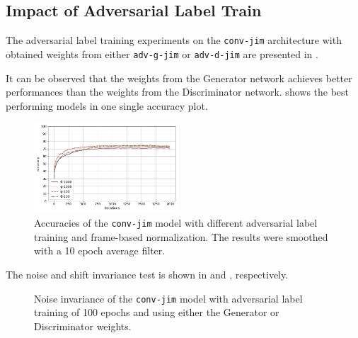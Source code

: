 \subsection{Impact of Adversarial Label Train}\label{sec:exp_adv_label}
The adversarial label training experiments on the \texttt{conv-jim} architecture with obtained weights from either \texttt{adv-g-jim} or \texttt{adv-d-jim} are presented in .

It can be observed that the weights from the Generator network achieves better performances than the weights from the Discriminator network.
 shows the best performing models in one single accuracy plot.
\begin{figure}[!ht]
  \centering
  \includegraphics[width=0.48\textwidth]{./5_exp/figs/exp_adv_label_acc_conv-jim.png}
  \caption{Accuracies of the \texttt{conv-jim} model with different adversarial label training and frame-based normalization. The results were smoothed with a 10 epoch average filter.}
  \label{fig:exp_adv_label_acc_conv-jim}
\end{figure}
\FloatBarrier
\noindent
The noise and shift invariance test is shown in  and , respectively.
\begin{figure}[!ht]
  \centering
  \qquad
  \caption{Noise invariance of the \texttt{conv-jim} model with adversarial label training of 100 epochs and using either the Generator or Discriminator weights.}
  \label{fig:exp_adv_label_tb_noise_conv-jim}
\end{figure}

